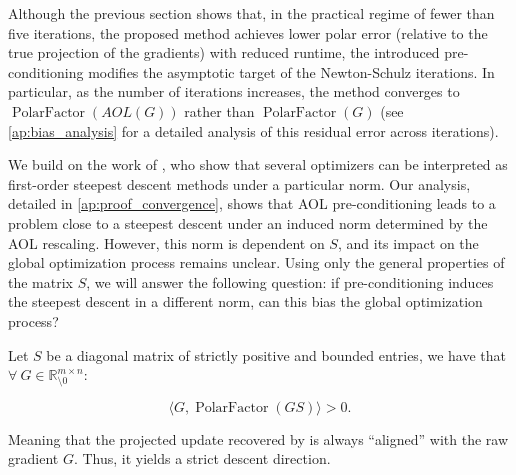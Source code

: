 Although the previous section shows that, in the practical regime of fewer than five iterations, the proposed method achieves lower polar error (relative to the true projection of the gradients) with reduced runtime, the introduced pre-conditioning modifies the asymptotic target of the Newton-Schulz iterations. In particular, as the number of iterations increases, the method converges to $\operatorname{PolarFactor}(AOL(G))$ rather than $\operatorname{PolarFactor}(G)$ (see \cref{ap:bias_analysis} for a detailed analysis of this residual error across iterations).

We build on the work of \cite{bernstein2024oldoptimizernewnorm}, who show that several optimizers can be interpreted as first-order steepest descent methods under a particular norm. Our analysis, detailed in \cref{ap:proof_convergence}, shows that AOL pre-conditioning leads to a problem close to a steepest descent under 
an induced norm determined by the AOL rescaling.
However, this norm is dependent on $S$, and its impact on the global optimization process remains unclear. Using only the general properties of the matrix $S$, we will answer the following question: if pre-conditioning induces the steepest descent in a different norm, can this bias the global optimization process?


        \begin{lemma}
        \label{lem:alignment}
            Let $S$ be a diagonal matrix of strictly positive and bounded entries, we have that $\forall \ G \in \mathbb{R}^{m \times n}_{\setminus 0}$:
        
            \begin{equation}
                \langle G, \operatorname{PolarFactor}(GS) \rangle > 0.
            \end{equation}
        
            \noindent Meaning that the projected update recovered by \turbomuon is always ``aligned'' with the raw gradient $G$. Thus, it yields a strict descent direction.
        \end{lemma}
        
